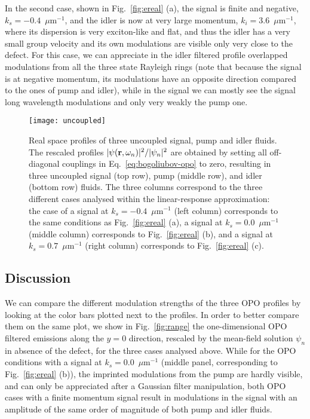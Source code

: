 In the second case, shown in Fig.~\ref{fig:ereal} (a), the signal is
finite and negative, $k_s = -0.4$~$\mu$m$^{-1}$, and the idler is now
at very large momentum, $k_i = 3.6$~$\mu$m$^{-1}$, where its
dispersion is very exciton-like and flat, and thus the idler has a
very small group velocity and its own modulations are visible only
very close to the defect. For this case, we can appreciate in the
idler filtered profile overlapped modulations from all the three state
Rayleigh rings (note that because the signal is at negative momentum,
its modulations have an opposite direction compared to the ones of
pump and idler), while in the signal we can mostly see the signal long
wavelength modulations and only very weakly the pump one.
%
\afterpage{\clearpage}
\begin{figure}[p]\centering
\texttt{[image: uncoupled]}
\caption{Real space profiles of three uncoupled signal, pump and idler
  fluids. The rescaled profiles $|\psi (\mathbf{r},\omega_n)|^2/|\psi_n|^2$
  are obtained by setting all off-diagonal couplings in
  Eq.~\eqref{eq:bogoliubov-opo} to zero, resulting in three uncoupled
  signal (top row), pump (middle row), and idler (bottom row)
  fluids. The three columns correspond to the three different cases
  analysed within the linear-response approximation: the case
  of a signal at $k_s = -0.4$~$\mu$m$^{-1}$ (left column) corresponds to
  the same conditions as Fig.~\ref{fig:ereal} (a), a signal at $k_s =
  0.0$~$\mu$m$^{-1}$ (middle column) corresponds to Fig.~\ref{fig:ereal}
  (b), and a signal at $k_s = 0.7$~$\mu$m$^{-1}$ (right column)
  corresponds to Fig.~\ref{fig:ereal} (c).}
\label{fig:uncou}
\end{figure}
%

\subsection{Discussion}
We can compare the different modulation strengths of the three OPO
profiles by looking at the color bars plotted next to the profiles. In
order to better compare them on the same plot, we show in
Fig.~\ref{fig:range} the one-dimensional OPO filtered emissions along
the $y=0$ direction, rescaled by the mean-field solution $\psi_n$ in
absence of the defect, for the three cases analysed above. While for
the OPO conditions with a signal at $k_s = 0.0$~$\mu$m$^{-1}$ (middle
panel, corresponding to Fig.~\ref{fig:ereal} (b)), the imprinted
modulations from the pump are hardly visible, and can only be
appreciated after a Gaussian filter manipulation, both OPO cases with
a finite momentum signal result in modulations in the signal with an
amplitude of the same order of magnitude of both pump and idler
fluids.

